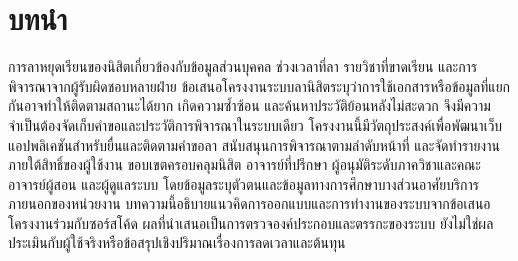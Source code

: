 \section{บทนำ}
การลาหยุดเรียนของนิสิตเกี่ยวข้องกับข้อมูลส่วนบุคคล ช่วงเวลาที่ลา รายวิชาที่ขาดเรียน และการพิจารณาจากผู้รับผิดชอบหลายฝ่าย ข้อเสนอโครงงานระบบลานิสิตระบุว่าการใช้เอกสารหรือข้อมูลที่แยกกันอาจทำให้ติดตามสถานะได้ยาก เกิดความซ้ำซ้อน และค้นหาประวัติย้อนหลังไม่สะดวก \cite{proposal} จึงมีความจำเป็นต้องจัดเก็บคำขอและประวัติการพิจารณาในระบบเดียว
โครงงานนี้มีวัตถุประสงค์เพื่อพัฒนาเว็บแอปพลิเคชันสำหรับยื่นและติดตามคำขอลา สนับสนุนการพิจารณาตามลำดับหน้าที่ และจัดทำรายงานภายใต้สิทธิ์ของผู้ใช้งาน ขอบเขตครอบคลุมนิสิต อาจารย์ที่ปรึกษา ผู้อนุมัติระดับภาควิชาและคณะ อาจารย์ผู้สอน และผู้ดูแลระบบ โดยข้อมูลระบุตัวตนและข้อมูลทางการศึกษาบางส่วนอาศัยบริการภายนอกของหน่วยงาน
บทความนี้อธิบายแนวคิดการออกแบบและการทำงานของระบบจากข้อเสนอโครงงานร่วมกับซอร์สโค้ด \cite{repo} ผลที่นำเสนอเป็นการตรวจองค์ประกอบและตรรกะของระบบ ยังไม่ใช่ผลประเมินกับผู้ใช้จริงหรือข้อสรุปเชิงปริมาณเรื่องการลดเวลาและต้นทุน
